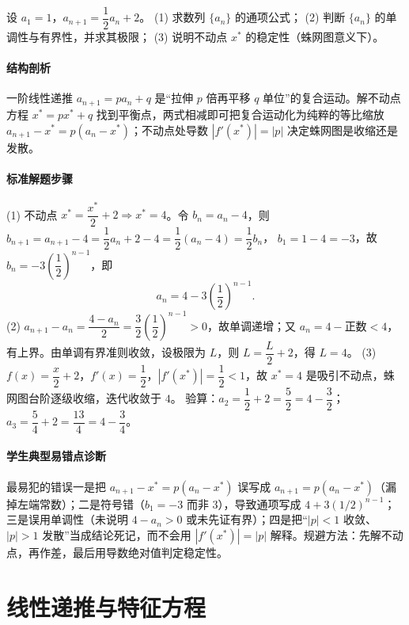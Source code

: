 \begin{problem}
设 $a_1=1$，$a_{n+1}=\dfrac12a_n+2$。
(1) 求数列 $\{a_n\}$ 的通项公式；
(2) 判断 $\{a_n\}$ 的单调性与有界性，并求其极限；
(3) 说明不动点 $x^*$ 的稳定性（蛛网图意义下）。
\end{problem}
\begin{solution}
\paragraph{结构剖析}
一阶线性递推 $a_{n+1}=pa_n+q$ 是“拉伸 $p$ 倍再平移 $q$ 单位”的复合运动。解不动点方程 $x^*=px^*+q$ 找到平衡点，两式相减即可把复合运动化为纯粹的等比缩放 $a_{n+1}-x^*=p(a_n-x^*)$；不动点处导数 $|f'(x^*)|=|p|$ 决定蛛网图是收缩还是发散。
\paragraph{标准解题步骤}
(1) 不动点 $x^*=\dfrac{x^*}{2}+2\Rightarrow x^*=4$。令 $b_n=a_n-4$，则
$b_{n+1}=a_{n+1}-4=\dfrac12a_n+2-4=\dfrac12(a_n-4)=\dfrac12b_n$，
$b_1=1-4=-3$，故 $b_n=-3\left(\dfrac12\right)^{n-1}$，即
$$a_n=4-3\left(\frac12\right)^{n-1}.$$
(2) $a_{n+1}-a_n=\dfrac{4-a_n}{2}=\dfrac32\left(\dfrac12\right)^{n-1}>0$，故单调递增；又 $a_n=4-\text{正数}<4$，有上界。由单调有界准则收敛，设极限为 $L$，则 $L=\dfrac L2+2$，得 $L=4$。
(3) $f(x)=\dfrac x2+2$，$f'(x)=\dfrac12$，$|f'(x^*)|=\dfrac12<1$，故 $x^*=4$ 是吸引不动点，蛛网图台阶逐级收缩，迭代收敛于 $4$。
验算：$a_2=\dfrac12+2=\dfrac52=4-\dfrac32$；$a_3=\dfrac54+2=\dfrac{13}4=4-\dfrac34$。
\paragraph{学生典型易错点诊断}
最易犯的错误一是把 $a_{n+1}-x^*=p(a_n-x^*)$ 误写成 $a_{n+1}=p(a_n-x^*)$（漏掉左端常数）；二是符号错（$b_1=-3$ 而非 $3$），导致通项写成 $4+3(1/2)^{n-1}$；三是误用单调性（未说明 $4-a_n>0$ 或未先证有界）；四是把“$|p|<1$ 收敛、$|p|>1$ 发散”当成结论死记，而不会用 $|f'(x^*)|=|p|$ 解释。规避方法：先解不动点，再作差，最后用导数绝对值判定稳定性。
\end{solution}

\section{线性递推与特征方程}

